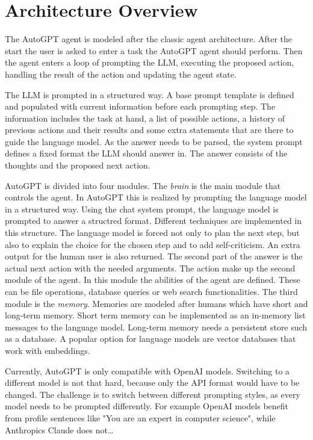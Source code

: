 \documentclass[english, version-2022-01]{uzl-thesis}
\begin{document}
\section{Architecture Overview}

The AutoGPT agent is modeled after the classic agent architecture. After the start the user is asked to enter a task the AutoGPT agent should perform. Then the agent enters a loop of prompting the LLM, executing the proposed action, handling the result of the action and updating the agent state.

The LLM is prompted in a structured way. A base prompt template is defined and populated with current information before each prompting step. The information includes the task at hand, a list of possible actions, a history of previous actions and their results and some extra statements that are there to guide the language model. As the answer needs to be parsed, the system prompt defines a fixed format the LLM should answer in. The answer consists of the thoughts and the proposed next action.


AutoGPT is divided into four modules. The \textit{brain} is the main module that controls the agent. In AutoGPT this is realized by prompting the language model in a structured way. Using the chat system prompt, the language model is prompted to answer a structred format. Different techniques are implemented in this structure. The language model is forced not only to plan the next step, but also to explain the choice for the chosen step and to add self-criticism. An extra output for the human user is also returned. The second part of the answer is the actual next action with the needed arguments. The action make up the second module of the agent. In this module the abilities of the agent are defined. These can be file operations, database queries or web search functionalities. The third module is the \textit{memory}. Memories are modeled after humans which have short and long-term memory. Short term memory can be implemented as an in-memory list messages to the language model. Long-term memory needs a persistent store such as a database. A popular option for language models are vector databases that work with embeddings.


Currently, AutoGPT is only compatible with OpenAI models. Switching to a different model is not that hard, because only the API format would have to be changed. The challenge is to switch between different prompting styles, as every model needs to be prompted differently. For example OpenAI models benefit from profile sentences like "You are an expert in computer science", while Anthropics Claude does not\dots
\end{document}
